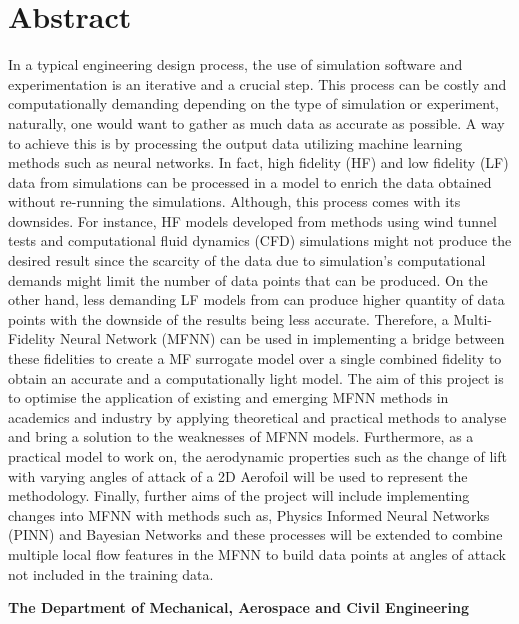 \documentclass[12pt,letterpaper]{article}
\begin{document}
\begingroup
\centering\section*{Abstract} \par
\endgroup
\vspace{-2em}
    In a typical engineering design process, the use of simulation software and experimentation is an iterative and a crucial step. This process can be costly and computationally demanding depending on the type of simulation or experiment, naturally, one would want to gather as much data as accurate as possible. A way to achieve this is by processing the output data utilizing machine learning methods such as neural networks. In fact, high fidelity (HF) and low fidelity (LF) data from simulations can be processed in a model to enrich the data obtained without re-running the simulations. Although, this process comes with its downsides. For instance, HF models developed from methods using wind tunnel tests and computational fluid dynamics (CFD) simulations might not produce the desired result since the scarcity of the data due to simulation's computational demands might limit the number of data points that can be produced. On the other hand, less demanding LF models from  can produce higher quantity of data points with the downside of the results being less accurate. Therefore, a Multi-Fidelity Neural Network (MFNN) can be used in implementing a bridge between these fidelities to create a MF surrogate model over a single combined fidelity to obtain an accurate and a computationally light model. The aim of this project is to optimise the application of existing and emerging MFNN methods in academics and industry by applying theoretical and practical methods to analyse and bring a solution to the weaknesses of MFNN models. Furthermore, as a practical model to work on, the aerodynamic properties such as the change of lift with varying angles of attack of a 2D Aerofoil will be used to represent the methodology. Finally, further aims of the project will include implementing changes into MFNN with methods such as, Physics Informed Neural Networks (PINN) and Bayesian Networks and these processes will be extended to combine multiple local flow features in the MFNN to build data points at angles of attack not included in the training data.
    \vfill
    \begin{center}
        { \bf  \large The Department of Mechanical, Aerospace and Civil Engineering}\\    
    \end{center}
\end{document}
